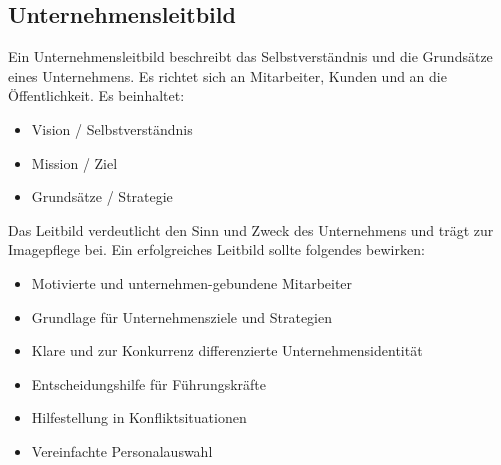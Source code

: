 \subsection{Unternehmensleitbild}
Ein Unternehmensleitbild beschreibt das Selbstverständnis und die Grundsätze eines Unternehmens. Es richtet sich an Mitarbeiter, Kunden und an die Öffentlichkeit. Es beinhaltet:

\begin{itemize}
    \item Vision / Selbstverständnis
    \item Mission / Ziel
    \item Grundsätze / Strategie
\end{itemize}

Das Leitbild verdeutlicht den Sinn und Zweck des Unternehmens und trägt zur Imagepflege bei. Ein erfolgreiches Leitbild sollte folgendes bewirken:

\begin{itemize}
    \item Motivierte und unternehmen-gebundene Mitarbeiter
    \item Grundlage für Unternehmensziele und Strategien
    \item Klare und zur Konkurrenz differenzierte Unternehmensidentität
    \item Entscheidungshilfe für Führungskräfte
    \item Hilfestellung in Konfliktsituationen
    \item Vereinfachte Personalauswahl
\end{itemize}